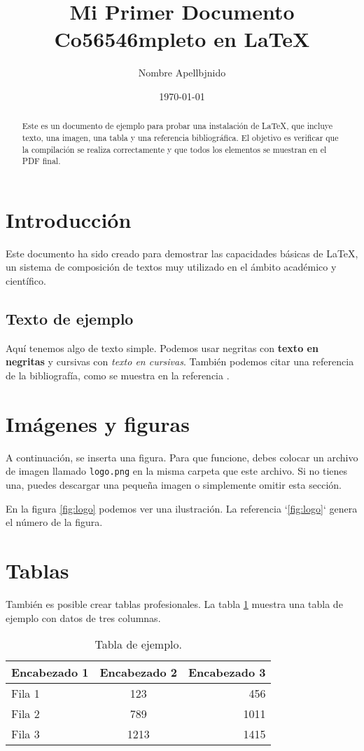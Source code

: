 \documentclass{article}
\title{Mi Primer Documento Co56546mpleto en \LaTeX}
\author{Nombre Apellbjnido}
\date{\today}
\begin{document}
\maketitle

\begin{abstract}
Este es un documento de ejemplo para probar una instalación de \LaTeX, que incluye texto, una imagen, una tabla y una referencia bibliográfica. El objetivo es verificar que la compilación se realiza correctamente y que todos los elementos se muestran en el PDF final.
\end{abstract}

\section{Introducción}
Este documento ha sido creado para demostrar las capacidades básicas de \LaTeX, un sistema de composición de textos muy utilizado en el ámbito académico y científico.

\subsection{Texto de ejemplo}
Aquí tenemos algo de texto simple. Podemos usar negritas con \textbf{texto en negritas} y cursivas con \textit{texto en cursivas}. También podemos citar una referencia de la bibliografía, como se muestra en la referencia \cite{greenwade93}.

\section{Imágenes y figuras}
A continuación, se inserta una figura. Para que funcione, debes colocar un archivo de imagen llamado \texttt{logo.png} en la misma carpeta que este archivo. Si no tienes una, puedes descargar una pequeña imagen o simplemente omitir esta sección.



En la figura \ref{fig:logo} podemos ver una ilustración. La referencia `\ref{fig:logo}` genera el número de la figura.

\section{Tablas}
También es posible crear tablas profesionales. La tabla \ref{tab:ejemplo} muestra una tabla de ejemplo con datos de tres columnas.

\begin{table}[h]
    \centering
    \caption{Tabla de ejemplo.}
    \label{tab:ejemplo}
    \begin{tabular}{lcr}
        \toprule
        Encabezado 1 & Encabezado 2 & Encabezado 3 \\
        \midrule
        Fila 1 & 123 & 456 \\
        Fila 2 & 789 & 1011 \\
        Fila 3 & 1213 & 1415 \\
        \bottomrule
    \end{tabular}
\end{table}
\end{document}

